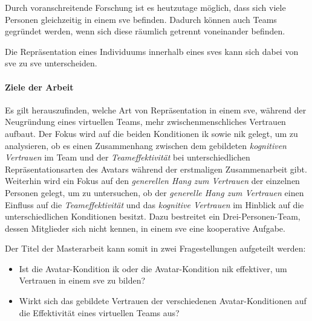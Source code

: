 \documentclass[a4paper,11pt]{article}%
\renewcommand{\\}{\vspace*{0.5\baselineskip} \newline}
\begin{document}
	Durch voranschreitende Forschung ist es heutzutage möglich, dass sich viele Personen gleichzeitig in einem \ac{sve} befinden. Dadurch können auch Teams gegründet werden, wenn sich diese räumlich getrennt voneinander befinden.
	
	Die Repräsentation eines Individuums innerhalb eines \ac{sve}s kann sich dabei von \ac{sve} zu \ac{sve} unterscheiden.
	
	\paragraph{Ziele der Arbeit}
%


Es gilt herauszufinden, welche Art von Repräsentation in einem \ac{sve}, während der Neugründung eines virtuellen Teams, mehr zwischenmenschliches Vertrauen aufbaut. Der Fokus wird auf die beiden Konditionen \ac{ik} sowie \ac{nik} gelegt, um zu analysieren, ob es einen Zusammenhang zwischen dem gebildeten \textit{kognitiven Vertrauen} im Team und der \textit{Teameffektivität} bei unterschiedlichen Repräsentationsarten des Avatars während der erstmaligen Zusammenarbeit gibt.
Weiterhin wird ein Fokus auf den \textit{generellen Hang zum Vertrauen} der einzelnen Personen gelegt, um zu untersuchen, ob der \textit{generelle Hang zum Vertrauen} einen Einfluss auf die \textit{Teameffektivität} und das \textit{kognitive Vertrauen} im Hinblick auf die unterschiedlichen Konditionen besitzt. Dazu bestreitet ein Drei-Personen-Team, dessen Mitglieder sich nicht kennen, in einem \ac{sve} eine kooperative Aufgabe.

Der Titel der Masterarbeit kann somit in zwei Fragestellungen aufgeteilt werden:
\begin{itemize}
\item Ist die Avatar-Kondition \ac{ik} oder die Avatar-Kondition \ac{nik} effektiver, um Vertrauen in einem \ac{sve} zu bilden?
\item Wirkt sich das gebildete Vertrauen der verschiedenen Avatar-Konditionen auf die Effektivität eines virtuellen Teams aus?
\end{itemize}
\end{document}
